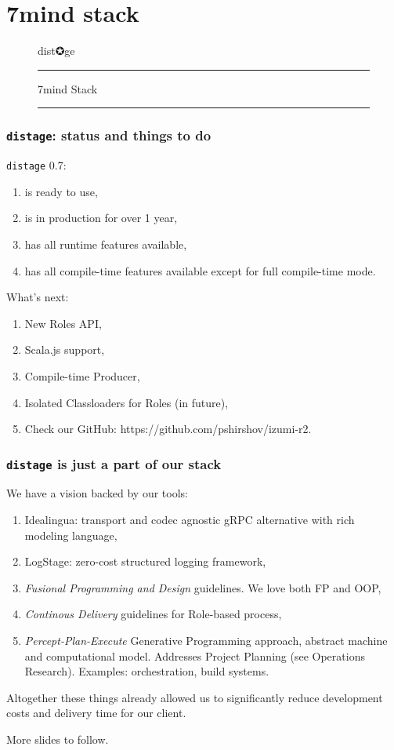 \documentclass[usenames,dvipsnames]{beamer}
\newcommand{\distage}{\texttt{distage}\xspace}
\begin{document}
\section{7mind stack}
\begin{frame}
  \begin{figure}
  \Huge
  \color{RubineRed} dist✪ge
  \noindent
  \rule{\linewidth}{1mm}
  \Large 7mind Stack
  \rule{\linewidth}{1mm}
  \end{figure}
\end{frame}

\begin{frame}[fragile]
  \frametitle{\distage: status and things to do}
  \distage{} 0.7:
  \begin{enumerate}
    \item is ready to use,
    \item is in production for over 1 year,
    \item has all runtime features available,
    \item has all compile-time features available except for full compile-time mode.
  \end{enumerate}
  \vspace{0.3cm}
  What's next:
  \begin{enumerate}
    \item New Roles API,
    \item Scala.js support,
    \item Compile-time Producer,
    \item Isolated Classloaders for Roles (in future),
    \item Check our GitHub: https://github.com/pshirshov/izumi-r2.
  \end{enumerate}
\end{frame}

\begin{frame}
  \frametitle{\distage is just a part of our stack}
  We have a vision backed by our tools:
  \begin{enumerate}
    \item Idealingua: transport and codec agnostic gRPC alternative with rich modeling language,
    \item LogStage: zero-cost structured logging framework,
    \item \textit{Fusional Programming and Design} guidelines. We love both FP and OOP,
    \item \textit{Continous Delivery} guidelines for Role-based process,
    \item \textit{Percept-Plan-Execute} Generative Programming approach, abstract machine and computational model.
    Addresses Project Planning (see Operations Research). Examples: orchestration, build systems.
  \end{enumerate}

  Altogether these things already allowed us to significantly reduce development costs and
  delivery time for our client.\newline

  More slides to follow.
\end{frame}
\end{document}
